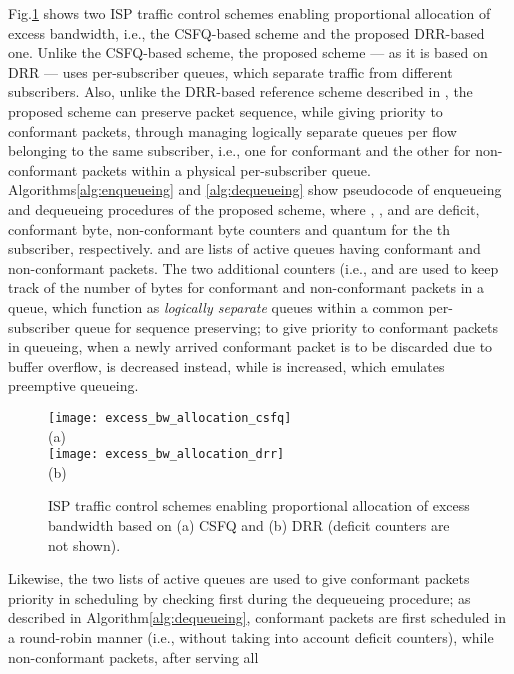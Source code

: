 \documentclass[conference,twoside,final]{IEEEtran}
\begin{document}
Fig.\ref{fg:isp_traffic_control_schemes} shows two ISP traffic control
schemes enabling proportional allocation of excess bandwidth, i.e., the
CSFQ-based scheme \cite{Kim:14-1} and the proposed DRR-based one. Unlike the
CSFQ-based scheme, the proposed scheme --- as it is based on DRR --- uses
per-subscriber queues, which separate traffic from different subscribers. Also,
unlike the DRR-based reference scheme described in \cite{Kim:14-1}, the proposed
scheme can preserve packet sequence, while giving priority to conformant
packets, through managing logically separate queues per flow belonging to the
same subscriber, i.e., one for conformant and the other for non-conformant
packets within a physical per-subscriber
queue. Algorithms\ref{alg:enqueueing} and \ref{alg:dequeueing} show
pseudocode of enqueueing and dequeueing procedures of the proposed scheme, where
, ,  and  are deficit, conformant byte,
non-conformant byte counters and quantum for the th subscriber,
respectively.  and  are lists of active
queues having conformant and non-conformant packets. The two additional counters
(i.e.,  and  are used to keep track of the number of bytes
for conformant and non-conformant packets in a queue, which function as
\textit{logically separate} queues within a common per-subscriber queue for
sequence preserving; to give priority to conformant packets in queueing, when a
newly arrived conformant packet is to be discarded due to buffer overflow,
 is decreased instead, while  is increased, which emulates
preemptive queueing.
\begin{figure}[!t]
\begin{center}
\texttt{[image: excess\_bw\_allocation\_csfq]}\\
  {\scriptsize (a)}\\
  \texttt{[image: excess\_bw\_allocation\_drr]}\\
  {\scriptsize (b)}
\end{center}
\caption{ISP traffic control schemes enabling proportional allocation of excess bandwidth
    based on (a) CSFQ \cite{Kim:14-1} and (b) DRR (deficit counters are not shown).}
\label{fg:isp_traffic_control_schemes}
\end{figure}
Likewise, the two lists of active queues are used to give conformant packets
priority in scheduling by checking  first during the dequeueing
procedure; as described in Algorithm\ref{alg:dequeueing}, conformant
packets are first scheduled in a round-robin manner (i.e., without taking into
account deficit counters), while non-conformant packets, after serving all
\end{document}
